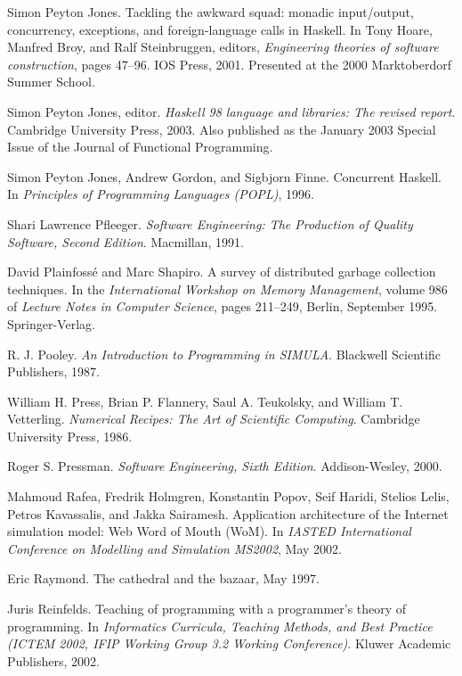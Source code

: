 \begin{thebibliography}{213}
Simon Peyton Jones. Tackling the awkward squad: monadic input/output, concurrency, exceptions, and foreign-language calls in Haskell. In Tony Hoare, Manfred Broy, and Ralf Steinbruggen, editors, \emph{Engineering theories of software construction}, pages 47–96. IOS Press, 2001. Presented at the 2000 Marktoberdorf Summer School.

Simon Peyton Jones, editor. \emph{Haskell 98 language and libraries: The revised report}. Cambridge University Press, 2003. Also published as the January 2003 Special Issue of the Journal of Functional Programming.

Simon Peyton Jones, Andrew Gordon, and Sigbjorn Finne. Concurrent Haskell. In \emph{Principles of Programming Languages (POPL)}, 1996.

Shari Lawrence Pfleeger. \emph{Software Engineering: The Production of Quality Software, Second Edition}. Macmillan, 1991.

David Plainfoss\'e and Marc Shapiro. A survey of distributed garbage collection techniques. In the \emph{International Workshop on Memory Management}, volume 986 of \emph{Lecture Notes in Computer Science}, pages 211–249, Berlin, September 1995. Springer-Verlag.

R. J. Pooley. \emph{An Introduction to Programming in SIMULA}. Blackwell Scientific Publishers, 1987.

William H. Press, Brian P. Flannery, Saul A. Teukolsky, and William T. Vetterling. \emph{Numerical Recipes: The Art of Scientific Computing}. Cambridge University Press, 1986.

Roger S. Pressman. \emph{Software Engineering, Sixth Edition}. Addison-Wesley, 2000.

Mahmoud Rafea, Fredrik Holmgren, Konstantin Popov, Seif Haridi, Stelios Lelis, Petros Kavassalis, and Jakka Sairamesh. Application architecture of the Internet simulation model: Web Word of Mouth (WoM). In \emph{IASTED International Conference on Modelling and Simulation MS2002}, May 2002.

Eric Raymond. The cathedral and the bazaar, May 1997.

Juris Reinfelds. Teaching of programming with a programmer’s theory of programming. In \emph{Informatics Curricula, Teaching Methods, and Best Practice (ICTEM 2002, IFIP Working Group 3.2 Working Conference)}. Kluwer Academic Publishers, 2002.


\end{thebibliography}
